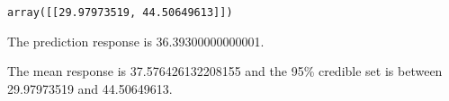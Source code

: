 \documentclass[11pt]{article}
\makeatletter
\newcommand{\boxspacing}{\kern\kvtcb@left@rule\kern\kvtcb@boxsep}
\newcommand{\prompt}[4]{
        \ttfamily\llap{{\color{#2}[#3]:\hspace{3pt}#4}}\vspace{-\baselineskip}
    }
\makeatother
\begin{document}
            \begin{tcolorbox}[breakable, size=fbox, boxrule=.5pt, pad at break*=1mm, opacityfill=0]
\prompt{Out}{outcolor}{41}{\boxspacing}
\begin{Verbatim}[commandchars=\\\{\}]
array([[29.97973519, 44.50649613]])
\end{Verbatim}
\end{tcolorbox}
        
    The prediction response is 36.39300000000001.

The mean response is 37.576426132208155 and the 95\% credible set is
between 29.97973519 and 44.50649613.


    
    
    
\end{document}
